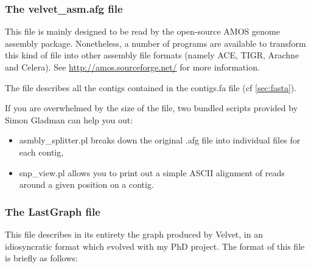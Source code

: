 \documentclass{article}
\begin{document}
\subsubsection{The velvet\_asm.afg file}

\label{sec:amos}

This file is mainly designed to be read by the open-source AMOS genome assembly package. Nonetheless, a number of programs are available to transform this kind of file into other assembly file formats (namely ACE, TIGR, Arachne and Celera). See \href{http://amos.sourceforge.net/}{http://amos.sourceforge.net/} for more information.

The file describes all the contigs contained in the contigs.fa file (cf \ref{sec:fasta}). 

If you are overwhelmed by the size of the file, two bundled scripts provided by Simon Gladman can help you out:
\begin{itemize}
\item asmbly\_splitter.pl breaks down the  original .afg file into individual files for each contig,
\item snp\_view.pl allows you to print out a simple ASCII alignment of reads around a given position on a contig.
\end{itemize}

\subsubsection{The LastGraph file}

This file describes in its entirety the graph produced by Velvet, in an idiosyncratic format which evolved with my PhD project. The format of this file is briefly as follows:
\end{document}
